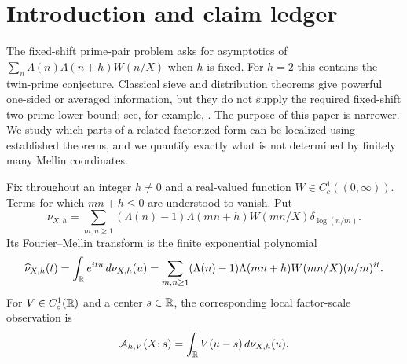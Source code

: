 \section{Introduction and claim ledger}
\label{sec:introduction}

The fixed-shift prime-pair problem asks for asymptotics of
\(
 \sum_n\Lambda(n)\Lambda(n+h)W(n/X)
\)
when $h$ is fixed.  For $h=2$ this contains the twin-prime conjecture.
Classical sieve and distribution theorems give powerful one-sided or
averaged information, but they do not supply the required fixed-shift
two-prime lower bound; see, for example,
\citep{HardyLittlewood1923,IwaniecKowalski2004,FriedlanderIwaniec1998,
FordMaynard2024}.  The purpose of this paper is narrower.  We study which
parts of a related factorized form can be localized using established
theorems, and we quantify exactly what is not determined by finitely many
Mellin coordinates.

Fix throughout an integer $h\ne0$ and a real-valued function
$W\in C_c^1((0,\infty))$.  Terms for which $mn+h\leq0$ are understood to
vanish.  Put
\begin{equation}\label{eq:intro-residual-measure}
 \nu_{X,h}
 =\sum_{m,n\geq1}
   (\Lambda(n)-1)\Lambda(mn+h)W(mn/X)
   \delta_{\log(n/m)}.
\end{equation}
Its Fourier--Mellin transform is the finite exponential polynomial
\begin{equation}\label{eq:intro-mellin-transform}
 \widehat\nu_{X,h}(t)
 =\int_{\mathbb R}e^{itu}\,d\nu_{X,h}(u)
 =\sum_{m,n\geq1}(\Lambda(n)-1)\Lambda(mn+h)W(mn/X)
   (n/m)^{it}.
\end{equation}
For $V\in C_c^1(\mathbb R)$ and a center $s\in\mathbb R$, the corresponding local
factor-scale observation is
\begin{equation}\label{eq:intro-local-window}
 \mathcal A_{h,V}(X;s)
 =\int_{\mathbb R}V(u-s)\,d\nu_{X,h}(u).
\end{equation}

